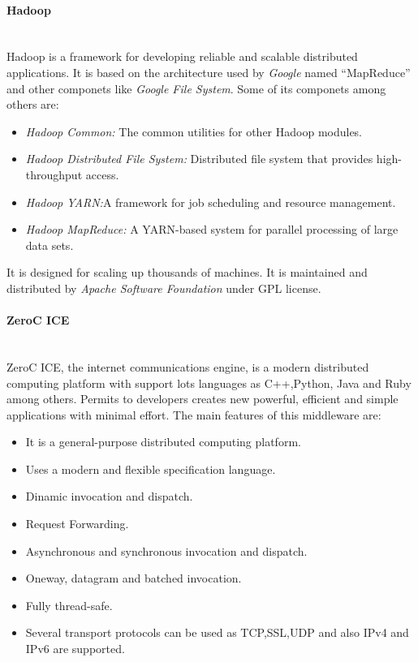 \paragraph{Hadoop}~\\
Hadoop is a framework for developing  reliable and scalable
distributed applications. It is based on
the architecture used by \emph{Google} named ``MapReduce'' and other componets
like \emph{Google File System}. 
Some of its componets among others are:
\begin{itemize}
\item \emph{Hadoop Common:} The common utilities for other Hadoop modules.
\item \emph{Hadoop Distributed File System:} Distributed file system that
  provides high-throughput access.
\item \emph{Hadoop YARN:}A framework for job scheduling and resource management.
\item \emph{Hadoop MapReduce:} A YARN-based system for parallel processing of
  large data sets.
\end{itemize}
It is designed for scaling up thousands of machines. It
is maintained and distributed by \emph{Apache Software Foundation} under GPL license.
 
\paragraph{ZeroC ICE}~\\
ZeroC ICE, the internet communications engine, is a modern distributed computing
platform with support lots languages as C++,Python, Java and Ruby among others.
Permits to developers creates new powerful, efficient and simple applications
with minimal effort.
The main features of this middleware are:
\begin{itemize}
\item It is a general-purpose distributed computing platform.
\item Uses a modern and flexible specification language.
\item Dinamic invocation and dispatch.
\item Request Forwarding.
\item Asynchronous and synchronous invocation and dispatch.
\item Oneway, datagram and batched invocation.
\item Fully thread-safe.
\item Several transport protocols can be used as TCP,SSL,UDP and also IPv4 and
  IPv6 are supported.
\end{itemize}

